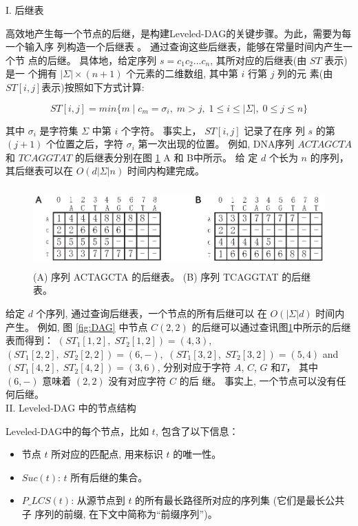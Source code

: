 I. 后继表
\label{sec:successor table}

高效地产生每一个节点的后继，是构建Leveled-DAG的关键步骤。为此，需要为每一个输入序
列构造一个后继表 \cite{Chen2006}。 通过查询这些后继表，能够在常量时间内产生一个节
点的后继。 具体地，给定序列 $s=c_1c_2...c_n$, 其所对应的后继表(由 $ST$ 表示)是一
个拥有 $|\Sigma| \times (n+1)$ 个元素的二维数组, 其中第 $i$ 行第 $j$ 列的元
素(由$ST[i, j]$表示)按照如下方式计算:

$$ST[i,j]=min\{m\;|\;c_m=\sigma_i,\; m > j,\; 1 \leq i \leq
|\Sigma|,\; 0 \leq j \leq n\}$$

其中 $\sigma_i$ 是字符集 $\Sigma$ 中第 $i$ 个字符。 事实上， $ST[i,j]$ 记录了在序
列 $s$ 的第 $(j+1)$ 个位置之后，字符 $\sigma_i$ 第一次出现的位置。 例如,
DNA序列 $ACTAGCTA$ 和 $TCAGGTAT$ 的后继表分别在图 \ref{fig:ST} A 和 B中所示。 给
定 $d$ 个长为 $n$ 的序列， 其后继表可以在 $O(d|\Sigma|n)$ 时间内构建完成。

\begin{figure}[!h]
  \centering
  \includegraphics[height=1.2in, width=4.8in]{figures/4_MLCS/ST}
  \caption{(A) 序列 ACTAGCTA 的后继表。 (B) 序列 TCAGGTAT 的后继表。}
    \label{fig:ST}
  \end{figure}

  给定 $d$ 个序列, 通过查询后继表，一个节点的所有后继可以
  在 $O(|\Sigma|d)$ 时间内产生。 例如, 图 \ref{fig:DAG} 中节点 $C(2,
  2)$ 的后继可以通过查讯图\ref{fig:ST}中所示的后继表而得到：
  $(ST_1[1, 2],\;ST_2[1, 2]) = (4, 3)$,\,
  $(ST_1[2, 2],\;ST_2[2, 2]) = (6, -)$,\,
  $(ST_1[3, 2],\;ST_2[3, 2]) = (5, 4)$ and
  $(ST_1[4, 2],\;ST_2[4, 2]) = (3, 6)$, 分别对应于字符 $A$, $C$,
  $G$ 和$T$， 其中 $(6, -)$ 意味着 $(2, 2)$ 没有对应字符 $C$ 的后
  继。 事实上, 一个节点可以没有任何后继。\\

\noindent II. Leveled-DAG 中的节点结构
\label{sec:Node}

Leveled-DAG中的每个节点，比如 $t$, 包含了以下信息：

\begin{itemize}
\item 节点 $t$ 所对应的匹配点, 用来标识 $t$ 的唯一性。
\item $Suc(t)$: $t$ 所有后继的集合。
\item $P\_LCS(t)$: 从源节点到 $t$ 的所有最长路径所对应的序列集 (它们是最长公共子
  序列的前缀, 在下文中简称为“前缀序列”)。
\end{itemize}

